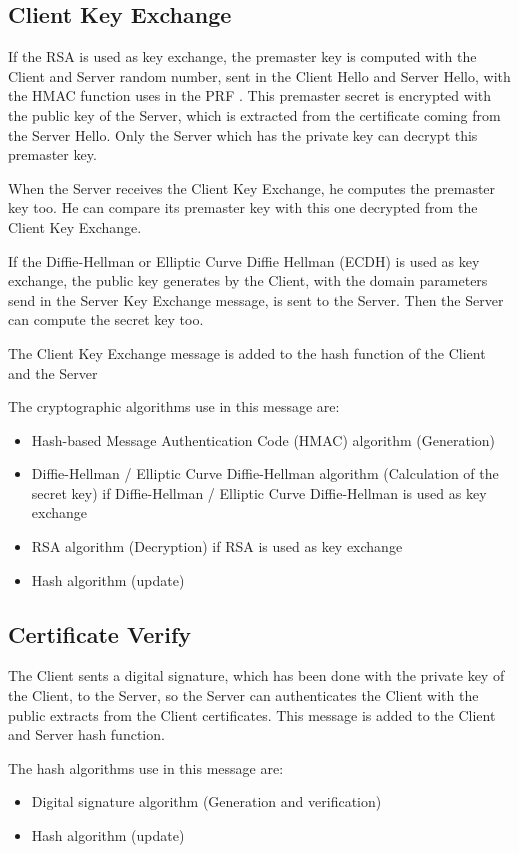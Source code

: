 \subsection*{Client Key Exchange}
If the RSA is used as key exchange, the premaster key is computed with the Client and Server random
number, sent in the Client Hello and Server Hello, with the HMAC function uses
in the PRF \cite{RFC5246}.
This premaster secret is encrypted with the public key of the Server, which is
extracted from the certificate coming from the Server Hello.
Only the Server which has the private key can decrypt this premaster key.

When the Server receives the Client Key Exchange, he computes the premaster key
too. He can compare its premaster key with this one decrypted from the Client
Key Exchange.

If the Diffie-Hellman or Elliptic Curve Diffie Hellman (ECDH) is used as key
exchange, the public key generates by the Client, with the domain parameters
send in the Server Key Exchange message, is sent to the Server.
Then the Server can compute the secret key too. 

The Client Key Exchange message is added to the hash function of the Client and
the Server

The cryptographic algorithms use in this message are:
\begin{itemize}[noitemsep]
  \item Hash-based Message Authentication Code (HMAC) algorithm (Generation)
  \item Diffie-Hellman / Elliptic Curve Diffie-Hellman algorithm (Calculation of
  the secret key) if Diffie-Hellman / Elliptic Curve Diffie-Hellman is used as
  key exchange
  \item RSA algorithm (Decryption) if RSA is used as key exchange
  \item Hash algorithm (update)
\end{itemize}

\subsection*{Certificate Verify}
The Client sents a digital signature, which has been done with the private key
of the Client, to the Server, so the Server can authenticates the Client with
the public extracts from the Client certificates.
This message is added to the Client and Server hash function.

The hash algorithms use in this message are:
\begin{itemize}[noitemsep]
  \item Digital signature algorithm (Generation and verification)
  \item Hash algorithm (update)
\end{itemize}


